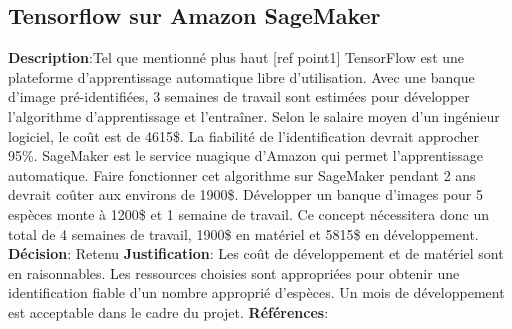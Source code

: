 

\subsection{Tensorflow sur Amazon SageMaker}
\label{s:identifier_conc2}

\textbf{Description}:Tel que mentionné plus haut [ref point1] TensorFlow est une plateforme d’apprentissage automatique libre d’utilisation.  Avec une banque d’image pré-identifiées, 3 semaines de travail sont estimées pour développer l'algorithme d’apprentissage et l’entraîner. Selon le salaire moyen d’un ingénieur logiciel, le coût est de 4615\$.  La fiabilité de l’identification devrait approcher 95\%. SageMaker est le service nuagique d’Amazon qui permet l’apprentissage automatique. Faire fonctionner cet algorithme sur SageMaker pendant 2 ans devrait coûter aux environs de 1900\$. Développer un banque d’images pour 5 espèces monte à 1200\$ et 1 semaine de travail. Ce concept nécessitera donc un total de 4 semaines de travail, 1900\$ en matériel et 5815\$ en développement.
\textbf{Décision}: Retenu
\textbf{Justification}: Les coût de développement et de matériel sont en raisonnables. Les ressources choisies sont appropriées pour obtenir une identification fiable d’un nombre approprié d’espèces. Un mois de développement est acceptable dans le cadre du projet.
\textbf{Références}:
\cite{tensorFlow, amzSage, fishID_2016, sal_ingLog}